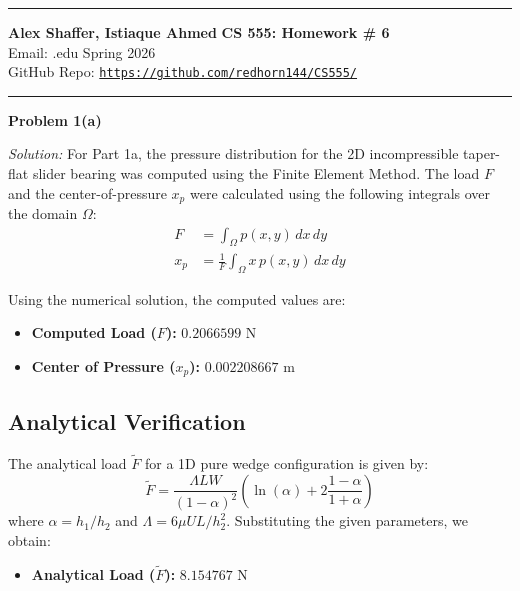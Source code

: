 \documentclass[11pt]{article}
\newcommand{\yourname}{Alex Shaffer, Istiaque Ahmed}
\newcommand{\hwnum}{6}
\newenvironment{problem}[2][Problem]
    { \begin{mdframed}[backgroundcolor=gray!20] \textbf{#1 #2} \\}
    {  \end{mdframed}}
\newenvironment{solution}
    {\textit{Solution:}}
    {}
\begin{document}
\noindent
\noindent\rule{\linewidth}{2pt}
\large\textbf{\yourname} \hfill \textbf{CS 555: Homework \# \hwnum}   \\
Email: \yournetid@illinois.edu \hfill Spring 2026\\
GitHub Repo: \texttt{\url{https://github.com/redhorn144/CS555/}} \\
\noindent\rule{\linewidth}{2pt}

\begin{problem}{1(a)}
\end{problem}

\begin{solution}
For Part 1a, the pressure distribution for the 2D incompressible taper-flat slider bearing was computed using the Finite Element Method. 
The load $F$ and the center-of-pressure $x_p$ were calculated using the following integrals over the domain $\Omega$:
\begin{align*}
    F &= \int_{\Omega} p(x,y) \, dx \, dy \\
    x_p &= \frac{1}{F} \int_{\Omega} x \, p(x,y) \, dx \, dy
\end{align*}

Using the numerical solution, the computed values are:
\begin{itemize}
    \item \textbf{Computed Load ($F$):} $0.2066599$ N
    \item \textbf{Center of Pressure ($x_p$):} $0.002208667$ m
\end{itemize}

\subsection*{Analytical Verification}
The analytical load $\tilde{F}$ for a 1D pure wedge configuration is given by:
\begin{equation*}
    \tilde{F} = \frac{\Lambda L W}{(1-\alpha)^2} \left( \ln(\alpha) + 2 \frac{1-\alpha}{1+\alpha} \right)
\end{equation*}
where $\alpha = h_1/h_2$ and $\Lambda = 6\mu U L / h_2^2$. Substituting the given parameters, we obtain:

\begin{itemize}
    \item \textbf{Analytical Load ($\tilde{F}$):} $8.154767$ N
\end{itemize}

\vspace{0.5cm}


\end{solution}
\end{document}

